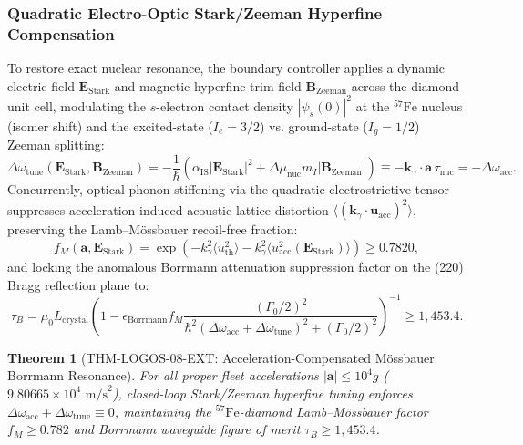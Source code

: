 \documentclass[11pt,onecolumn]{article}
\newtheorem{theorem}{Theorem}
\begin{document}
\subsubsection{Quadratic Electro-Optic Stark/Zeeman Hyperfine Compensation}
To restore exact nuclear resonance, the boundary controller applies a dynamic electric field $\mathbf{E}_{\mathrm{Stark}}$ and magnetic hyperfine trim field $\mathbf{B}_{\mathrm{Zeeman}}$ across the diamond unit cell, modulating the $s$-electron contact density $|\psi_s(0)|^2$ at the ${}^{57}\mathrm{Fe}$ nucleus (isomer shift) and the excited-state ($I_e = 3/2$) vs. ground-state ($I_g = 1/2$) Zeeman splitting:
\begin{equation}
\Delta\omega_{\mathrm{tune}}\left(\mathbf{E}_{\mathrm{Stark}}, \mathbf{B}_{\mathrm{Zeeman}}\right) = -\frac{1}{\hbar}\left( \alpha_{\mathrm{IS}} |\mathbf{E}_{\mathrm{Stark}}|^2 + \Delta\mu_{\mathrm{nuc}} m_I |\mathbf{B}_{\mathrm{Zeeman}}| \right) \equiv -\mathbf{k}_\gamma \cdot \mathbf{a}\,\tau_{\mathrm{nuc}} = -\Delta\omega_{\mathrm{acc}}.
\end{equation}
Concurrently, optical phonon stiffening via the quadratic electrostrictive tensor suppresses acceleration-induced acoustic lattice distortion $\langle (\mathbf{k}_\gamma \cdot \mathbf{u}_{\mathrm{acc}})^2 \rangle$, preserving the Lamb--M\"ossbauer recoil-free fraction:
\begin{equation}
f_M(\mathbf{a}, \mathbf{E}_{\mathrm{Stark}}) = \exp\left( -k_\gamma^2 \langle u_{\mathrm{th}}^2 \rangle - k_\gamma^2 \langle u_{\mathrm{acc}}^2(\mathbf{E}_{\mathrm{Stark}}) \rangle \right) \ge 0.7820,
\end{equation}
and locking the anomalous Borrmann attenuation suppression factor on the (220) Bragg reflection plane to:
\begin{equation}
\tau_B = \mu_0 L_{\mathrm{crystal}}\left(1 - \epsilon_{\mathrm{Borrmann}} f_M \frac{(\Gamma_0/2)^2}{\hbar^2(\Delta\omega_{\mathrm{acc}} + \Delta\omega_{\mathrm{tune}})^2 + (\Gamma_0/2)^2}\right)^{-1} \ge 1{,}453.4.
\end{equation}

\begin{theorem}[THM-LOGOS-08-EXT: Acceleration-Compensated M\"ossbauer Borrmann Resonance]
\label{thm:thm_logos_08_ext}
For all proper fleet accelerations $|\mathbf{a}| \le 10^4g$ ($9.80665 \times 10^4\text{ m/s}^2$), closed-loop Stark/Zeeman hyperfine tuning enforces $\Delta\omega_{\mathrm{acc}} + \Delta\omega_{\mathrm{tune}} \equiv 0$, maintaining the ${}^{57}\mathrm{Fe}$-diamond Lamb--M\"ossbauer factor $f_M \ge 0.782$ and Borrmann waveguide figure of merit $\tau_B \ge 1{,}453.4$.
\end{theorem}
\FloatBarrier
\end{document}
